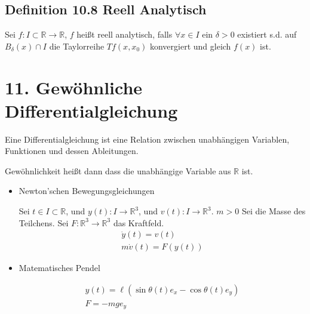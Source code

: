\documentclass[]{scrartcl}
\begin{document}
\subsection{Definition 10.8 Reell Analytisch}
Sei $f:I\subset\mathbb R \rightarrow \mathbb R$, $f$ heißt reell analytisch, falls $\forall x\in I$ ein $\delta>0$ existiert s.d. auf $B_\delta(x)\cap I$ die Taylorreihe $Tf(x,x_0)$ konvergiert und gleich $f(x)$ ist.

\section{11. Gewöhnliche Differentialgleichung}
Eine Differentialgleichung ist eine Relation zwischen unabhängigen Variablen, Funktionen und dessen Ableitungen.

Gewöhnlichkeit heißt dann dass die unabhängige Variable aus $\mathbb R$ ist.

\begin{itemize}
	\item Newton'schen Bewegungsgleichungen

		Sei $t\in I\subset \mathbb R$, und $y(t):I\rightarrow\mathbb R^3$, und $v(t):I\rightarrow \mathbb R^3$. $m>0$ Sei die Masse des Teilchens. Sei $F:\mathbb R^3\rightarrow \mathbb R^3$ das Kraftfeld.
		\begin{gather}
			\dot y(t) = v(t)\\
			m\dot v(t) = F(y(t))
		\end{gather}
	\item Matematisches Pendel

		\begin{gather}
			y(t) = \ell(\sin\theta(t) e_x - \cos\theta(t) e_y)\\
			F = -mge_y
		\end{gather}
\end{itemize}
\end{document}
